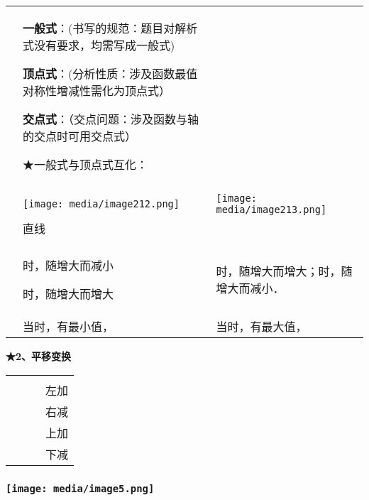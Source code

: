 \documentclass[a4paper,11pt,UTF8]{ctexart}
\begin{document}
\begin{longtable}[]{@{}lll@{}}
\toprule
\endhead
\begin{minipage}[t]{0.30\columnwidth}\raggedright
\strut
\end{minipage} & \begin{minipage}[t]{0.30\columnwidth}\raggedright
\textbf{一般式}：(书写的规范：题目对解析式没有要求，均需写成一般式)

\textbf{顶点式}：(分析性质：涉及函数最值对称性增减性需化为顶点式）

\textbf{交点式}：（交点问题：涉及函数与轴的交点时可用交点式）

★一般式与顶点式互化：\strut
\end{minipage} & \begin{minipage}[t]{0.30\columnwidth}\raggedright
\strut
\end{minipage}\tabularnewline
& &\tabularnewline
& \texttt{[image: media/image212.png]}
&
\texttt{[image: media/image213.png]}\tabularnewline
& 直线 &\tabularnewline
& &\tabularnewline
\begin{minipage}[t]{0.30\columnwidth}\raggedright
\strut
\end{minipage} & \begin{minipage}[t]{0.30\columnwidth}\raggedright
时，随增大而减小

时，随增大而增大\strut
\end{minipage} & \begin{minipage}[t]{0.30\columnwidth}\raggedright
时，随增大而增大；时，随增大而减小．\strut
\end{minipage}\tabularnewline
& 当时，有最小值， & 当时，有最大值，\tabularnewline
\bottomrule
\end{longtable}

\textbf{★2、平移变换}

\begin{longtable}[]{@{}llll@{}}
\toprule
\endhead
& & &\tabularnewline
& & & 左加\tabularnewline
& & & 右减\tabularnewline
& & & 上加\tabularnewline
& & & 下减\tabularnewline
\bottomrule
\end{longtable}

\hypertarget{ux5b66ux79d1ux7f51www.zxxk.com--ux6559ux80b2ux8d44ux6e90ux95e8ux6237ux63d0ux4f9bux8bd5ux9898ux8bd5ux5377ux6559ux6848ux8bfeux4ef6ux6559ux5b66ux8bbaux6587ux7d20ux6750ux7b49ux5404ux7c7bux6559ux5b66ux8d44ux6e90ux5e93ux4e0bux8f7dux8fd8ux6709ux5927ux91cfux4e30ux5bccux7684ux6559ux5b66ux8d44ux8baf-40}{%
\subsubsection{\texorpdfstring{\protect\texttt{[image: media/image5.png]}}{学科网(www.zxxk.com)-\/-教育资源门户，提供试题试卷、教案、课件、教学论文、素材等各类教学资源库下载，还有大量丰富的教学资讯！}}\label{ux5b66ux79d1ux7f51www.zxxk.com--ux6559ux80b2ux8d44ux6e90ux95e8ux6237ux63d0ux4f9bux8bd5ux9898ux8bd5ux5377ux6559ux6848ux8bfeux4ef6ux6559ux5b66ux8bbaux6587ux7d20ux6750ux7b49ux5404ux7c7bux6559ux5b66ux8d44ux6e90ux5e93ux4e0bux8f7dux8fd8ux6709ux5927ux91cfux4e30ux5bccux7684ux6559ux5b66ux8d44ux8baf-40}}
\end{document}
